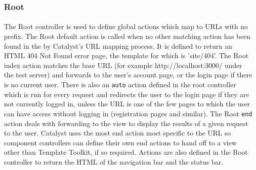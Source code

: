 \subsubsection{Root}
\label{sec:controller_root}

\paragraph{}
The Root controller is used to define global actions which map to URLs with no prefix. The Root default action is called when no other matching action has been found in the by Catalyst's URL mapping process. It is defined to return an HTML 404 Not Found error page, the template for which is 'site/404'. The Root index action matches the base URL (for example http://localhost:3000/ under the test server) and forwards to the user's account page, or the login page if there is no current user. There is also an \texttt{auto} action defined in the root controller which is run for every request and redirects the user to the login page if they are not currently logged in, unless the URL is one of the few pages to which the user can have access without logging in (registration pages and similar). The Root \texttt{end} action deals with forwarding to the view to display the results of a given request to the user. Catalyst uses the most end action most specific to the URL so component controllers can define their own end actions to hand off to a view other than Template Toolkit, if so required. Actions are also defined in the Root controller to return the HTML of the navigation bar and the status bar. 